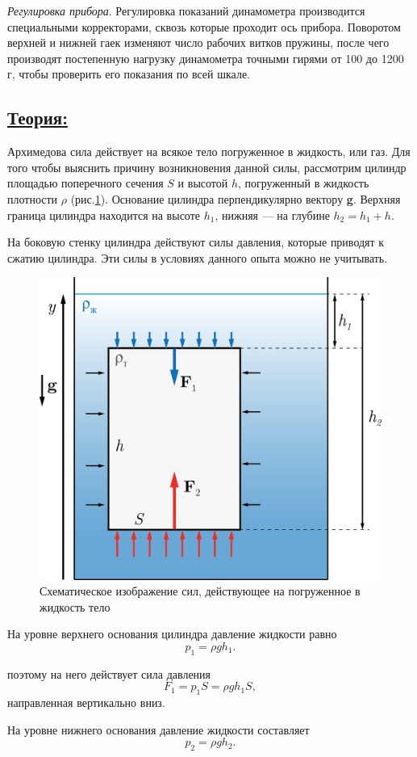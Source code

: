 \documentclass[14pt,a4paper,oneside]{extarticle}	%
\begin{document}
\textit{Регулировка прибора}. Регулировка показаний динамометра производится специальными корректорами, сквозь которые проходит ось прибора.
Поворотом верхней и нижней гаек изменяют число рабочих витков пружины, после чего производят постепенную нагрузку динамометра точными гирями от 100 до 1200 г, чтобы проверить его показания по всей шкале.

\newpage
\subsection*{\underline{Теория:}}

Архимедова сила действует на всякое тело погруженное в жидкость, или газ.
Для того чтобы выяснить причину возникновения данной силы, рассмотрим цилиндр площадью поперечного сечения $ S $ и высотой $ h $, погруженный в жидкость плотности $\rho$ (рис.\ref{newton-4}). 
Основание цилиндра перпендикулярно вектору \textbf{g}. 
Верхняя граница цилиндра находится на высоте $ h_{1} $, нижняя — на глубине $ h_{2} = h_{1} + h $.

На боковую стенку цилиндра действуют силы давления, которые приводят к сжатию цилиндра.
Эти силы в условиях данного опыта можно не учитывать.

\begin{figure}[H] 
	\centering 	
	\includegraphics[width=0.6\linewidth]{newton-4.png}
	\caption{Схематическое изображение сил, действующее на погруженное в жидкость тело}
	\label{newton-4}
\end{figure}

На уровне верхнего основания цилиндра давление жидкости равно $$ p_{1} = \rho gh_{1}. $$

поэтому на него действует сила давления $$ F_{1} = p_{1}S = \rho gh_{1}S, $$
направленная вертикально вниз.

На уровне нижнего основания давление жидкости составляет $$p_{2} = \rho gh_{2}.$$
\end{document}
